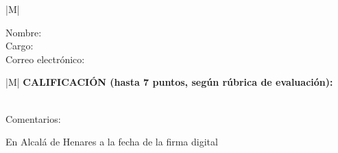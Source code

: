 \documentclass[10pt,a4paper,oneside]{article}
\begin{document}
\ifthenelse{\equal{\myCoTutorFullName}{}}
{
}
{

\noindent
\begin{tabular}{|M{\textwidth}|}
\hline
\textbf{\small \MakeUppercase{\wordCoTutorOrCoTutora}}\vspace*{-5.5pt}\\
\hline
\end{tabular}


\begin{description}
  \item[Nombre:] \myCoTutorFullName
  \item[Cargo:] \myCoTutorPosition
  \item[Correo electrónico:] \myCoTutorEmail
\end{description}
}

\vspace{0.25cm}


\noindent
\begin{tabular}{|M{\textwidth}|}
  \hline
  \textbf{\small CALIFICACIÓN (hasta 7 puntos, según rúbrica de evaluación):  \myAcademicTutorGrade}\vspace*{-5.5pt}\\
  \\
\hline
\end{tabular}


\begin{description}
  \item[Comentarios:] %
\end{description}
\vfill{}

\noindent En Alcalá de Henares a la fecha de la firma digital %
\end{document}
